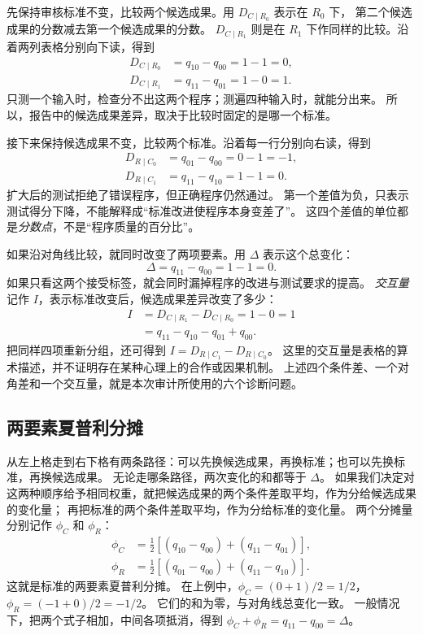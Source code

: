 先保持审核标准不变，比较两个候选成果。用 $D_{C\mid R_0}$ 表示在 $R_0$ 下，
第二个候选成果的分数减去第一个候选成果的分数。
$D_{C\mid R_1}$ 则是在 $R_1$ 下作同样的比较。沿着两列表格分别向下读，得到
\begin{align*}
D_{C\mid R_0}&=q_{10}-q_{00}=1-1=0,\\
D_{C\mid R_1}&=q_{11}-q_{01}=1-0=1.
\end{align*}
只测一个输入时，检查分不出这两个程序；测遍四种输入时，就能分出来。
所以，报告中的候选成果差异，取决于比较时固定的是哪一个标准。

接下来保持候选成果不变，比较两个标准。沿着每一行分别向右读，得到
\begin{align*}
D_{R\mid C_0}&=q_{01}-q_{00}=0-1=-1,\\
D_{R\mid C_1}&=q_{11}-q_{10}=1-1=0.
\end{align*}
扩大后的测试拒绝了错误程序，但正确程序仍然通过。
第一个差值为负，只表示测试得分下降，不能解释成“标准改进使程序本身变差了”。
这四个差值的单位都是\emph{分数点}，不是“程序质量的百分比”。

如果沿对角线比较，就同时改变了两项要素。用 $\Delta$ 表示这个总变化：
\[
\Delta=q_{11}-q_{00}=1-1=0.
\]
如果只看这两个接受标签，就会同时漏掉程序的改进与测试要求的提高。
\emph{交互量}记作 $I$，表示标准改变后，候选成果差异改变了多少：
\begin{align*}
I&=D_{C\mid R_1}-D_{C\mid R_0}=1-0=1\\
 &=q_{11}-q_{10}-q_{01}+q_{00}.
\end{align*}
把同样四项重新分组，还可得到
$I=D_{R\mid C_1}-D_{R\mid C_0}$。
这里的交互量是表格的算术描述，并不证明存在某种心理上的合作或因果机制。
上述四个条件差、一个对角差和一个交互量，就是本次审计所使用的六个诊断问题。

\subsection{两要素夏普利分摊}
\label{subsec:allocation}

从左上格走到右下格有两条路径：可以先换候选成果，再换标准；也可以先换标准，再换候选成果。
无论走哪条路径，两次变化的和都等于 $\Delta$。
如果我们决定对这两种顺序给予相同权重，就把候选成果的两个条件差取平均，作为分给候选成果的变化量；
再把标准的两个条件差取平均，作为分给标准的变化量。
两个分摊量分别记作 $\phi_C$ 和 $\phi_R$：
\begin{align*}
\phi_C&=\tfrac12[(q_{10}-q_{00})+(q_{11}-q_{01})],\\
\phi_R&=\tfrac12[(q_{01}-q_{00})+(q_{11}-q_{10})].
\end{align*}
这就是标准的两要素夏普利分摊。\cite{shapley}
在上例中，$\phi_C=(0+1)/2=1/2$，$\phi_R=(-1+0)/2=-1/2$。
它们的和为零，与对角线总变化一致。
一般情况下，把两个式子相加，中间各项抵消，得到
$\phi_C+\phi_R=q_{11}-q_{00}=\Delta$。


